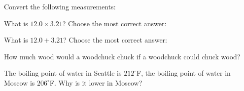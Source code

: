 \documentclass[11pt,addpoints]{exam}   	%
\begin{document}
\begin{questions}


\question
Convert the following measurements:


\question[5]
What is $ 12.0 \times 3.21 $? Choose the most correct answer:

\begin{choices}
\end{choices}

\question[5]
What is $ 12.0 + 3.21 $? Choose the most correct answer:

\begin{choices}
\end{choices}

\question[1]
How much wood would a woodchuck chuck if a woodchuck could chuck
wood?

\question[1]
The boiling point of water in Seattle is $212^{\circ}$F, the boiling point of water in Moscow is $206^{\circ}$F. Why is it lower in Moscow?


\end{questions}
\end{document}
